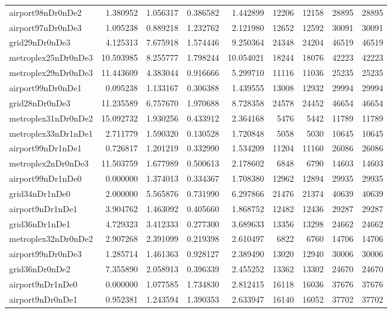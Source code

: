 \begin{longtable}{|l|r|r|r|r|r|r|r|r|}
airport98nDr0nDe2 & 1.380952 & 1.056317 & 0.386582 & 1.442899 & 12206 & 12158 & 28895 & 28895 \\
airport97nDr0nDe3 & 1.095238 & 0.889218 & 1.232762 & 2.121980 & 12652 & 12592 & 30091 & 30091 \\
grid29nDr0nDe3 & 4.125313 & 7.675918 & 1.574446 & 9.250364 & 24348 & 24204 & 46519 & 46519 \\
metroplex25nDr0nDe3 & 10.593985 & 8.255777 & 1.798244 & 10.054021 & 18244 & 18076 & 42223 & 42223 \\
metroplex29nDr0nDe3 & 11.443609 & 4.383044 & 0.916666 & 5.299710 & 11116 & 11036 & 25235 & 25235 \\
airport99nDr0nDe1 & 0.095238 & 1.133167 & 0.306388 & 1.439555 & 13008 & 12932 & 29994 & 29994 \\
grid28nDr0nDe3 & 11.235589 & 6.757670 & 1.970688 & 8.728358 & 24578 & 24452 & 46654 & 46654 \\
metroplex31nDr0nDe2 & 15.092732 & 1.930256 & 0.433912 & 2.364168 & 5476 & 5442 & 11789 & 11789 \\
metroplex33nDr1nDe1 & 2.711779 & 1.590320 & 0.130528 & 1.720848 & 5058 & 5030 & 10645 & 10645 \\
airport99nDr1nDe1 & 0.726817 & 1.201219 & 0.332990 & 1.534209 & 11204 & 11160 & 26086 & 26086 \\
metroplex2nDr0nDe3 & 11.503759 & 1.677989 & 0.500613 & 2.178602 & 6848 & 6790 & 14603 & 14603 \\
airport99nDr1nDe0 & 0.000000 & 1.374013 & 0.334367 & 1.708380 & 12962 & 12894 & 29935 & 29935 \\
grid34nDr1nDe0 & 2.000000 & 5.565876 & 0.731990 & 6.297866 & 21476 & 21374 & 40639 & 40639 \\
airport9nDr1nDe1 & 3.904762 & 1.463092 & 0.405660 & 1.868752 & 12482 & 12436 & 29287 & 29287 \\
grid36nDr1nDe1 & 4.729323 & 3.412333 & 0.277300 & 3.689633 & 13356 & 13298 & 24662 & 24662 \\
metroplex32nDr0nDe2 & 2.907268 & 2.391099 & 0.219398 & 2.610497 & 6822 & 6760 & 14706 & 14706 \\
airport99nDr0nDe3 & 1.285714 & 1.461363 & 0.928127 & 2.389490 & 13020 & 12940 & 30006 & 30006 \\
grid36nDr0nDe2 & 7.355890 & 2.058913 & 0.396339 & 2.455252 & 13362 & 13302 & 24670 & 24670 \\
airport9nDr1nDe0 & 0.000000 & 1.077585 & 1.734830 & 2.812415 & 16118 & 16036 & 37676 & 37676 \\
airport9nDr0nDe1 & 0.952381 & 1.243594 & 1.390353 & 2.633947 & 16140 & 16052 & 37702 & 37702 \\

\end{longtable}
